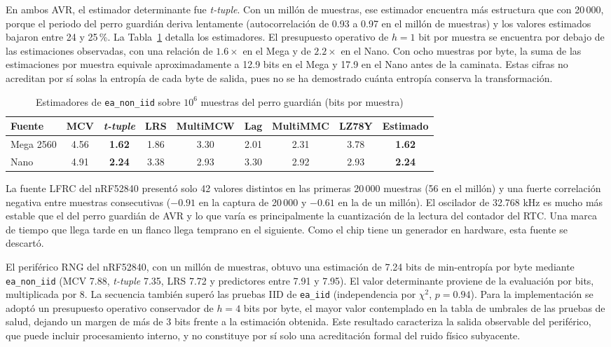 En ambos AVR, el estimador determinante fue \textit{t-tuple}. Con un millón de muestras, ese estimador encuentra más estructura que con 20\,000, porque el periodo del perro guardián deriva lentamente (autocorrelación de 0.93 a 0.97 en el millón de muestras) y los valores estimados bajaron entre 24 y 25\,\%. La Tabla~\ref{tab:res_estimadores_avr} detalla los estimadores. El presupuesto operativo de $h=1$ bit por muestra se encuentra por debajo de las estimaciones observadas, con una relación de $1.6\times$ en el Mega y de $2.2\times$ en el Nano. Con ocho muestras por byte, la suma de las estimaciones por muestra equivale aproximadamente a 12.9 bits en el Mega y 17.9 en el Nano antes de la caminata. Estas cifras no acreditan por sí solas la entropía de cada byte de salida, pues no se ha demostrado cuánta entropía conserva la transformación.

\begin{table}[H]
\centering
\caption{Estimadores de \texttt{ea\_non\_iid} sobre $10^6$ muestras del perro guardián (bits por muestra)}
\label{tab:res_estimadores_avr}
\begin{tabular}{@{}lcccccccc@{}}
\toprule
\textbf{Fuente} & \textbf{MCV} & \textbf{\textit{t-tuple}} & \textbf{LRS} & \textbf{MultiMCW} & \textbf{Lag} & \textbf{MultiMMC} & \textbf{LZ78Y} & \textbf{Estimado} \\
\midrule
Mega 2560 & 4.56 & \textbf{1.62} & 1.86 & 3.30 & 2.01 & 2.31 & 3.78 & \textbf{1.62} \\
Nano & 4.91 & \textbf{2.24} & 3.38 & 2.93 & 3.30 & 2.92 & 2.93 & \textbf{2.24} \\
\bottomrule
\end{tabular}
\end{table}

La fuente LFRC del nRF52840 presentó solo 42 valores distintos en las primeras 20\,000 muestras (56 en el millón) y una fuerte correlación negativa entre muestras consecutivas ($-0.91$ en la captura de 20\,000 y $-0.61$ en la de un millón). El oscilador de 32.768 kHz es mucho más estable que el del perro guardián de AVR y lo que varía es principalmente la cuantización de la lectura del contador del RTC. Una marca de tiempo que llega tarde en un flanco llega temprano en el siguiente. Como el chip tiene un generador en hardware, esta fuente se descartó.

El periférico RNG del nRF52840, con un millón de muestras, obtuvo una estimación de 7.24 bits de min-entropía por byte mediante \texttt{ea\_non\_iid} (MCV 7.88, \textit{t-tuple} 7.35, LRS 7.72 y predictores entre 7.91 y 7.95). El valor determinante proviene de la evaluación por bits, multiplicada por 8. La secuencia también superó las pruebas IID de \texttt{ea\_iid} (independencia por $\chi^2$, $p = 0.94$). Para la implementación se adoptó un presupuesto operativo conservador de $h=4$ bits por byte, el mayor valor contemplado en la tabla de umbrales de las pruebas de salud, dejando un margen de más de 3 bits frente a la estimación obtenida. Este resultado caracteriza la salida observable del periférico, que puede incluir procesamiento interno, y no constituye por sí solo una acreditación formal del ruido físico subyacente.

